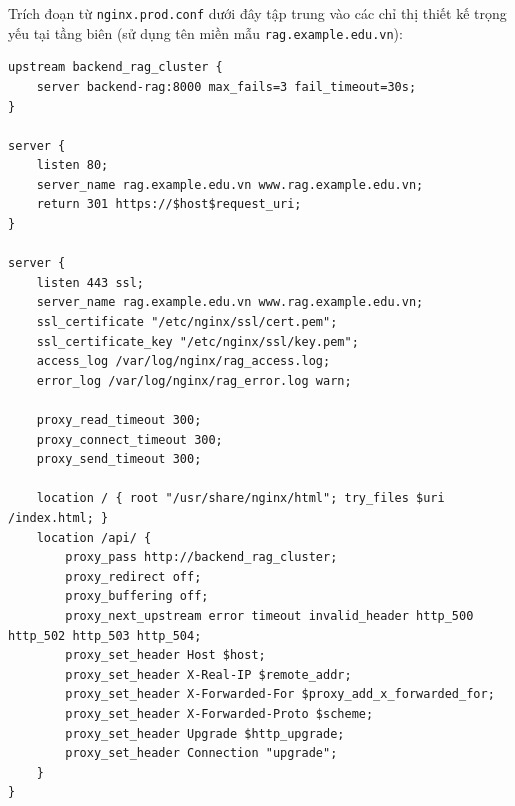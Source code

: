 Trích đoạn từ \texttt{nginx.\allowbreak{}prod.\allowbreak{}conf} dưới đây tập trung vào các chỉ thị thiết kế trọng yếu tại tầng biên (sử dụng tên miền mẫu \texttt{rag.\allowbreak{}example.\allowbreak{}edu.\allowbreak{}vn}):

\begin{verbatim}
upstream backend_rag_cluster {
    server backend-rag:8000 max_fails=3 fail_timeout=30s;
}

server {
    listen 80;
    server_name rag.example.edu.vn www.rag.example.edu.vn;
    return 301 https://$host$request_uri;
}

server {
    listen 443 ssl;
    server_name rag.example.edu.vn www.rag.example.edu.vn;
    ssl_certificate "/etc/nginx/ssl/cert.pem";
    ssl_certificate_key "/etc/nginx/ssl/key.pem";
    access_log /var/log/nginx/rag_access.log;
    error_log /var/log/nginx/rag_error.log warn;

    proxy_read_timeout 300;
    proxy_connect_timeout 300;
    proxy_send_timeout 300;

    location / { root "/usr/share/nginx/html"; try_files $uri /index.html; }
    location /api/ {
        proxy_pass http://backend_rag_cluster;
        proxy_redirect off;
        proxy_buffering off;
        proxy_next_upstream error timeout invalid_header http_500 http_502 http_503 http_504;
        proxy_set_header Host $host;
        proxy_set_header X-Real-IP $remote_addr;
        proxy_set_header X-Forwarded-For $proxy_add_x_forwarded_for;
        proxy_set_header X-Forwarded-Proto $scheme;
        proxy_set_header Upgrade $http_upgrade;
        proxy_set_header Connection "upgrade";
    }
}
\end{verbatim}

